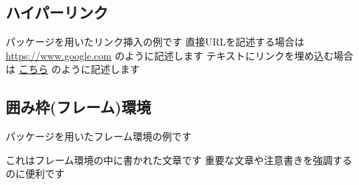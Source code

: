 \documentclass[../../main]{subfiles}
\begin{document}
\subsection{ハイパーリンク}
パッケージを用いたリンク挿入の例です\p
直接URLを記述する場合は \url{https://www.google.com} のように記述します\p
テキストにリンクを埋め込む場合は \href{https://www.google.com}{こちら} のように記述します\p

\subsection{囲み枠(フレーム)環境}
パッケージを用いたフレーム環境の例です\p

\begin{framed}
  これはフレーム環境の中に書かれた文章です\p
  重要な文章や注意書きを強調するのに便利です\p
  \cite{einstein1905}
\end{framed}
\end{document}
